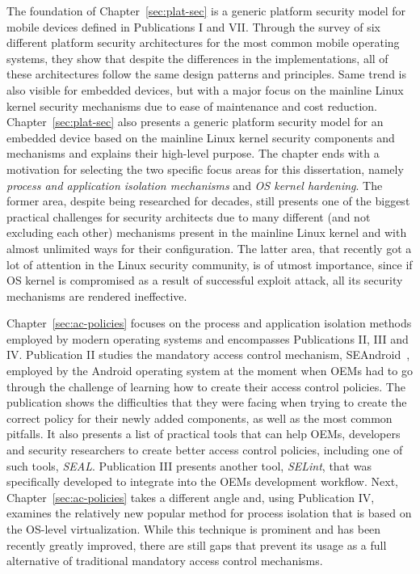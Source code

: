 The foundation of Chapter~\ref{sec:plat-sec} is a generic platform security model for mobile devices defined in Publications I and VII. Through the survey of six different platform security architectures for the most common mobile operating systems, they show that despite the differences in the implementations, all of these architectures follow the same design patterns and principles. Same trend is also visible for embedded devices, but with a major focus on the mainline Linux kernel security mechanisms due to ease of maintenance and cost reduction. Chapter~\ref{sec:plat-sec} also presents a generic platform security model for an embedded device based on the mainline Linux kernel security components and mechanisms and explains their high-level purpose. The chapter ends with a motivation for selecting the two specific focus areas for this dissertation, namely \textit{process and application isolation mechanisms} and \textit{OS kernel hardening}. The former area, despite being researched for decades, still presents one of the biggest practical challenges for security architects due to many different (and not excluding each other) mechanisms present in the mainline Linux kernel and with almost unlimited ways for their configuration. The latter area, that recently got a lot of attention in the Linux security community, is of utmost importance, since if OS kernel is compromised as a result of successful exploit attack, all its security mechanisms are rendered ineffective.

Chapter~\ref{sec:ac-policies} focuses on the process and application isolation methods employed by modern operating systems and encompasses Publications II, III and IV. Publication II studies the mandatory access control mechanism, SEAndroid~\cite{smalley12}, employed by the Android operating system at the moment when OEMs had to go through the challenge of learning how to create their access control policies. The publication shows the difficulties that they were facing when trying to create the correct policy for their newly added components, as well as the most common pitfalls. It also presents a list of practical tools that can help OEMs, developers and security researchers to create better access control policies, including one of such tools, \textit{SEAL}. Publication III presents another tool, \textit{SELint}, that was specifically developed to integrate into the OEMs development workflow. Next, Chapter~\ref{sec:ac-policies} takes a different angle and, using Publication IV, examines the relatively new popular method for process isolation that is based on the OS-level virtualization. While this technique is prominent and has been recently greatly improved, there are still gaps that prevent its usage as a full alternative of traditional mandatory access control mechanisms.

